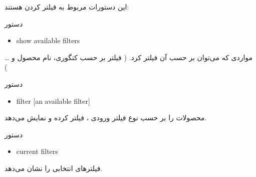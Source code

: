 \documentclass[]{article}
\begin{document}
این دستورات مربوط به فیلتر کردن هستند:


\begin{mybox}[colback=brilliantlavender]{دستور}

\begin{latin}

\begin{itemize}[label = {$\Rightarrow$}]

\item
show available filters

\end{itemize}

\end{latin}

\end{mybox}

مواردی که می‌توان بر حسب آن فیلتر کرد. ( فیلتر بر حسب کتگوری، نام محصول و … )



\begin{mybox}[colback=brilliantlavender]{دستور}

\begin{latin}

\begin{itemize}[label = {$\Rightarrow$}]

\item
filter [an available filter]

\end{itemize}

\end{latin}

\end{mybox}

محصولات را بر حسب نوع فیلتر ورودی ، فیلتر کرده و نمایش می‌دهد.



\begin{mybox}[colback=brilliantlavender]{دستور}

\begin{latin}

\begin{itemize}[label = {$\Rightarrow$}]

\item
current filters

\end{itemize}

\end{latin}

\end{mybox}

فیلترهای انتخابی را نشان می‌دهد.
\end{document}
